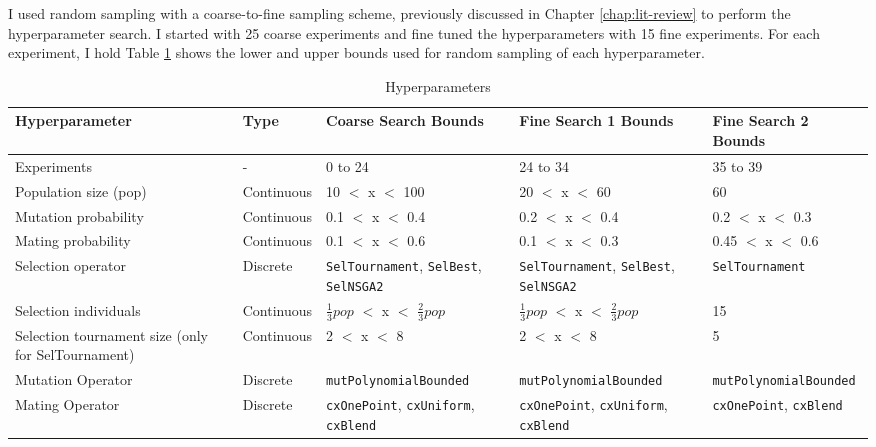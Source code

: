 I used random sampling with a coarse-to-fine sampling scheme, previously 
discussed in Chapter \ref{chap:lit-review} to perform the hyperparameter search. 
I started with 25 coarse experiments and fine tuned the hyperparameters
with 15 fine experiments. 
For each experiment, I hold 
Table \ref{tab:hyperparameter_search} shows the lower and upper bounds used 
for random sampling of each hyperparameter. 
\begin{table}[]
    \centering
    \onehalfspacing
    \caption{Hyperparameters}
	\label{tab:hyperparameter_search}
    \footnotesize
    \begin{tabular}{p{4cm}lp{3.4cm}p{3.4cm}p{3.4cm}}
    \hline 
    \textbf{Hyperparameter}& \textbf{Type} & \textbf{Coarse Search Bounds} & \textbf{Fine Search 1 Bounds} & \textbf{Fine Search 2 Bounds} \\
    \hline
    Experiments & - & 0 to 24 & 24 to 34 & 35 to 39 \\ 
    \hline
    Population size (pop) & Continuous & 10 $<$ x $<$ 100 & 20 $<$ x $<$ 60 & 60 \\ 
    Mutation probability & Continuous & 0.1 $<$ x $<$ 0.4 & 0.2 $<$ x $<$ 0.4& 0.2 $<$ x $<$ 0.3\\
    Mating probability & Continuous & 0.1 $<$ x $<$ 0.6 &  0.1 $<$ x $<$ 0.3 &  0.45 $<$ x $<$ 0.6\\
    Selection operator & Discrete & \texttt{SelTournament}, \texttt{SelBest}, \texttt{SelNSGA2} & \texttt{SelTournament}, \texttt{SelBest}, \texttt{SelNSGA2}& \texttt{SelTournament}\\
    Selection individuals & Continuous & $\frac{1}{3}pop$ $<$ x $<$ $\frac{2}{3}pop$ & $\frac{1}{3}pop$ $<$ x $<$ $\frac{2}{3}pop$ & 15\\
    Selection tournament size (only for SelTournament) & Continuous & 2 $<$ x $<$ 8 &2 $<$ x $<$ 8&5\\
    Mutation Operator & Discrete & \texttt{mutPolynomialBounded} &\texttt{mutPolynomialBounded}&\texttt{mutPolynomialBounded}\\
    Mating Operator & Discrete& \texttt{cxOnePoint}, \texttt{cxUniform}, \texttt{cxBlend} &\texttt{cxOnePoint}, \texttt{cxUniform}, \texttt{cxBlend}&\texttt{cxOnePoint}, \texttt{cxBlend}\\ 
    \hline
    \end{tabular}
\end{table}

